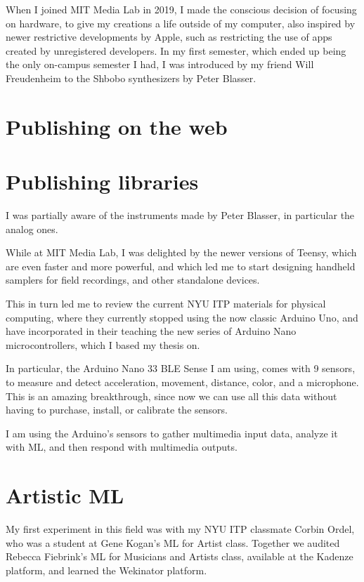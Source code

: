 When I joined MIT Media Lab in 2019, I made the conscious decision of focusing on hardware, to give my creations a life outside of my computer, also inspired by newer restrictive developments by Apple, such as restricting the use of apps created by unregistered developers. In my first semester, which ended up being the only on-campus semester I had, I was introduced by my friend Will Freudenheim to the Shbobo synthesizers by Peter Blasser.

\section{Publishing on the web}

\section{Publishing libraries}

I was partially aware of the instruments made by Peter Blasser, in particular the analog ones.

While at MIT Media Lab, I was delighted by the newer versions of Teensy, which are even faster and more powerful, and which led me to start designing handheld samplers for field recordings, and other standalone devices.

This in turn led me to review the current \acrshort{NYU} \acrshort{ITP} materials for physical computing, where they currently stopped using the now classic Arduino Uno, and have incorporated in their teaching the new series of Arduino Nano microcontrollers, which I based my thesis on.

In particular, the Arduino Nano 33 \acrshort{BLE} Sense I am using, comes with 9 sensors, to measure and detect acceleration, movement, distance, color, and a microphone. This is an amazing breakthrough, since now we can use all this data without having to purchase, install, or calibrate the sensors.

I am using the Arduino's sensors to gather multimedia input data, analyze it with \acrshort{ML}, and then respond with multimedia outputs.

\section{Artistic ML}

My first experiment in this field was with my \acrshort{NYU} \acrshort{ITP} classmate Corbin Ordel, who was a student at Gene Kogan's \acrshort{ML} for Artist class. Together we audited Rebecca Fiebrink's \acrshort{ML} for Musicians and Artists class, available at the Kadenze platform, and learned the Wekinator platform.

